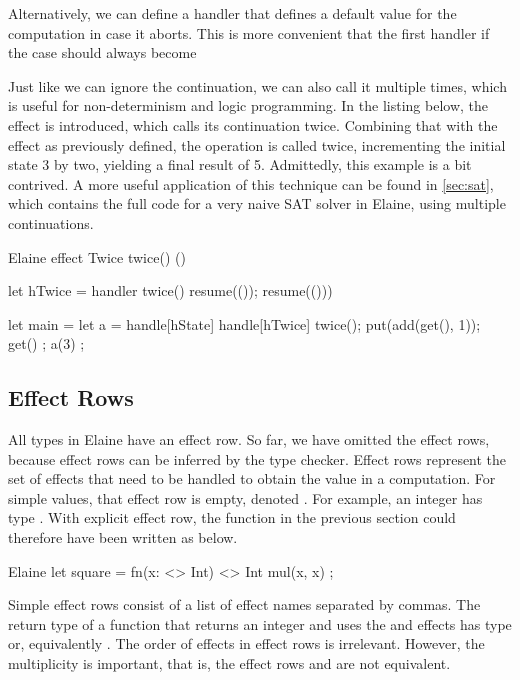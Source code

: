 
Alternatively, we can define a handler that defines a default value for the computation in case it aborts. This is more convenient that the first handler if the  case should always become


Just like we can ignore the continuation, we can also call it multiple times, which is useful for non-determinism and logic programming. In the listing below, the  effect is introduced, which calls its continuation twice. Combining that with the  effect as previously defined, the  operation is called twice, incrementing the initial state 3 by two, yielding a final result of 5. Admittedly, this example is a bit contrived. A more useful application of this technique can be found in \cref{sec:sat}, which contains the full code for a very naive SAT solver in Elaine, using multiple continuations.

\begin{lst}{Elaine}
effect Twice {
    twice() ()
}

let hTwice = handler {
    twice() {
        resume(());
        resume(()))
    }
}

let main = {
    let a = handle[hState] handle[hTwice] {
        twice();
        put(add(get(), 1));
        get()
    };
    a(3)
};
\end{lst}
%
\subsection{Effect Rows}

All types in Elaine have an effect row. So far, we have omitted the effect rows, because effect rows can be inferred by the type checker. Effect rows represent the set of effects that need to be handled to obtain the value in a computation. For simple values, that effect row is empty, denoted \el{<>}. For example, an integer has type . With explicit effect row, the  function in the previous section could therefore have been written as below.

\begin{lst}{Elaine}
let square = fn(x: <> Int) <> Int {
    mul(x, x)
};
\end{lst}
%
Simple effect rows consist of a list of effect names separated by commas. The return type of a function that returns an integer and uses the  and  effects has type  or, equivalently . The order of effects in effect rows is irrelevant. However, the multiplicity is important, that is, the effect rows  and  are not equivalent.


